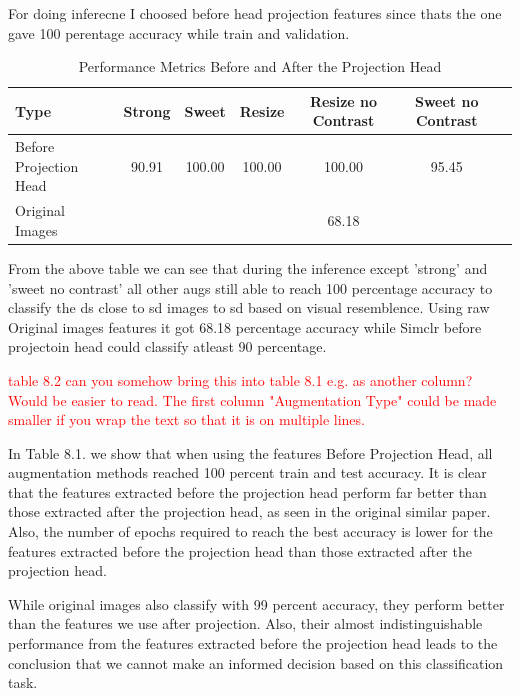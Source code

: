 For doing inferecne I choosed before head projection features since thats the one gave 100 perentage accuracy while train and validation.


\begin{table}[H]
    \centering
    \begin{tabular}{@{}lcccccc@{}}
    \toprule
    \textbf{Type} & \textbf{Strong} & \textbf{Sweet} & \textbf{Resize} & \textbf{Resize no Contrast} & \textbf{Sweet no Contrast} \\ \midrule
    Before Projection Head & 90.91 & 100.00 & 100.00 & 100.00 & 95.45 \\ \midrule
    Original Images & & & & 68.18 & \\ \bottomrule
    \end{tabular}
    \caption{Performance Metrics Before and After the Projection Head}
    \label{tab:performance_metrics}
\end{table}




From the above table we can see that during the inference except 'strong' and 'sweet no contrast' all other augs still able to reach 100 percentage accuracy to classify the ds 
close to sd images to sd based on visual resemblence. Using raw Original images features it got  68.18 percentage accuracy while Simclr before projectoin head could classify atleast 90 percentage.


\textcolor{red}{table 8.2 can you somehow bring this into table 8.1 e.g. as another column? Would be easier to read. The first column 
"Augmentation Type" could be made smaller if you wrap the text so that it is on multiple lines.} 


In Table 8.1. we show that when using the features Before Projection Head, all augmentation methods reached 100 percent train and test accuracy. It is clear that the features extracted 
before the projection head perform far better than those extracted after the projection head, as seen in the original similar paper. Also, the number of epochs required
to reach the best accuracy is lower for the features extracted before the projection head than those extracted after the projection head.

While original images also classify with 99 percent accuracy, they perform better than the features we use after projection. Also, their almost indistinguishable performance 
from the features extracted before the projection head leads to the conclusion that we cannot make an informed decision based on this classification task.




